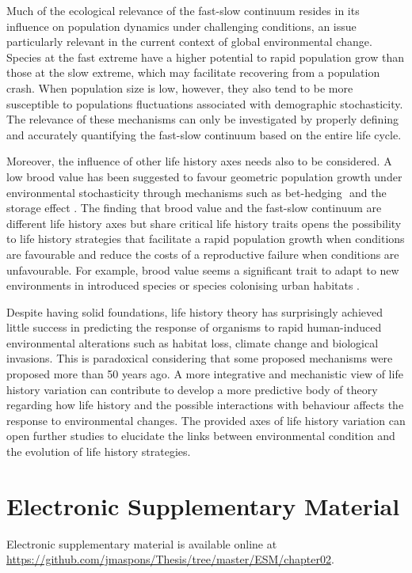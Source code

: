 Much of the ecological relevance of the fast-slow continuum resides in its 
influence on population dynamics under challenging conditions, an issue 
particularly relevant in the current context of global environmental change. 
Species at the fast extreme have a higher potential to rapid population grow 
than those at the slow extreme, which may facilitate recovering from a 
population crash. When population size is low, however, they also tend to be 
more susceptible to populations fluctuations associated with demographic 
stochasticity. The relevance of these mechanisms can only be investigated by 
properly defining and accurately quantifying the fast-slow continuum based on 
the entire life cycle. 

Moreover, the influence of other life history axes needs also to be considered. 
A low brood value has been suggested to favour geometric population growth under 
environmental stochasticity through mechanisms such as bet-hedging 
\citep{Stearns2000a}⁠ and the storage effect \citep{Cubaynes2011}. The finding
that brood value and the fast-slow continuum are different life history axes but
share critical life history traits opens the possibility to life history
strategies that facilitate a rapid population growth when conditions are
favourable and reduce the costs of a reproductive failure when conditions are
unfavourable. For example, brood value seems a significant trait to adapt to
new environments in introduced species or species colonising urban habitats
\citep{Sol2012a,Sol2014}.

Despite having solid foundations, life history theory has surprisingly achieved 
little success in predicting the response of organisms to rapid human-induced 
environmental alterations such as habitat loss, climate change and biological 
invasions. This is paradoxical considering that some proposed mechanisms were 
proposed more than 50 years ago. A more integrative and mechanistic view of life 
history variation can contribute to develop a more predictive body of theory 
regarding how life history and the possible interactions with behaviour
\citep{Ricklefs2002,Reale2010a,Sol2018,Maspons2019} affects the response to
environmental changes. The provided axes of life history variation can open
further studies to elucidate the links between environmental condition and the
evolution of life history strategies.


\section*{Electronic Supplementary Material}

Electronic supplementary material is available online at
\url{https://github.com/jmaspons/Thesis/tree/master/ESM/chapter02}.
